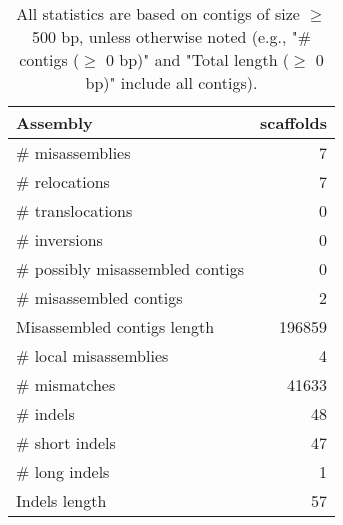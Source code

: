 \documentclass[12pt,a4paper]{article}
\begin{document}
\begin{table}[ht]
\begin{center}
\caption{All statistics are based on contigs of size $\geq$ 500 bp, unless otherwise noted (e.g., "\# contigs ($\geq$ 0 bp)" and "Total length ($\geq$ 0 bp)" include all contigs).}
\begin{tabular}{|l*{1}{|r}|}
\hline
Assembly & scaffolds \\ \hline
\# misassemblies & 7 \\ \hline
\hspace{5mm}\# relocations & 7 \\ \hline
\hspace{5mm}\# translocations & 0 \\ \hline
\hspace{5mm}\# inversions & 0 \\ \hline
\# possibly misassembled contigs & 0 \\ \hline
\# misassembled contigs & 2 \\ \hline
Misassembled contigs length & 196859 \\ \hline
\# local misassemblies & 4 \\ \hline
\# mismatches & 41633 \\ \hline
\# indels & 48 \\ \hline
\hspace{5mm}\# short indels & 47 \\ \hline
\hspace{5mm}\# long indels & 1 \\ \hline
Indels length & 57 \\ \hline
\end{tabular}
\end{center}
\end{table}
\end{document}
